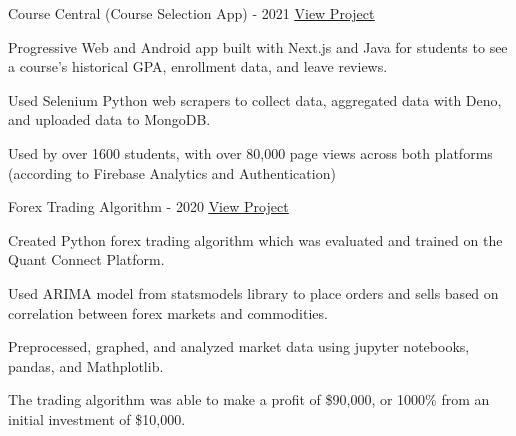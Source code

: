 

\begin{cventries}

  \cventry
    {} %
    {Course Central (Course Selection App) - 2021} %
    {\href{https://coursecentral.ca/}{\underline{View Project}}} %
    {} %
    {
      \begin{cvitems} %
        \item {Progressive Web and Android app built with Next.js and Java for students to see a course's historical GPA, enrollment data, and leave reviews.}
        \item {Used Selenium Python web scrapers to collect data, aggregated data with Deno, and uploaded data to MongoDB.}
        \item {Used by over 1600 students, with over 80,000 page views across both platforms (according to Firebase Analytics and Authentication)}
      \end{cvitems}
    }

  \cventry
    {} %
    {Forex Trading Algorithm - 2020} %
    {\href{https://github.com/KnlnKS/Forex-Price-Predictor-Quantconnect}{\underline{View Project}}} %
    {} %
    {
      \begin{cvitems} %
        \item {Created Python forex trading algorithm which was evaluated and trained on the Quant Connect Platform.}
        \item {Used ARIMA model from statsmodels library to place orders and sells based on correlation between forex markets and commodities.}
        \item {Preprocessed, graphed, and analyzed market data using jupyter notebooks, pandas, and Mathplotlib.}
        \item {The trading algorithm was able to make a profit of \$90,000, or 1000\% from an initial investment of \$10,000.}
      \end{cvitems}
    }


\end{cventries}
